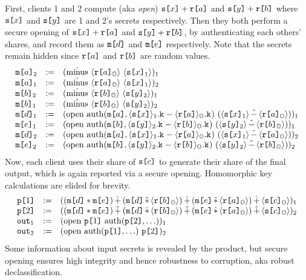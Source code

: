 First, clients 1 and 2 compute (aka \emph{open}) $\texttt{s[}x\texttt{]} +
\texttt{r[}a\texttt{]}$ and $\texttt{s[}y\texttt{]} + \texttt{r[}b\texttt{]}$ where $\texttt{s[}x\texttt{]}$ and
$\texttt{s[}y\texttt{]}$ are 1 and 2's secrets respectively.  Then they both
perform a secure opening of $\texttt{s[}x\texttt{]} + \texttt{r[}a\texttt{]}$ and
$\texttt{s[}y\texttt{]} + \texttt{r[}b\texttt{]}$, by authenticating each others' shares,
and record them as $\texttt{m[}d\texttt{]}$ and $\texttt{m[}e\texttt{]}$ respectively. Note
that the secrets remain hidden since $\texttt{r[}a\texttt{]}$ and $\texttt{r[}b\texttt{]}$
are random values.
$$
\begin{array}{lcl}
  \elab{\mesg{a}}{2} &:=&
  \elab{(\macotp\ \macgv{\elab{\flip{a}}{\Oracle}}\ \macgv{\elab{\secret{x}}{1}})}{1}\\
  \elab{\mesg{a}}{1} &:=&
  \elab{(\macotp\ \macgv{\elab{\flip{a}}{\Oracle}}\ \macgv{\elab{\secret{x}}{1}})}{2}\\
  \elab{\mesg{b}}{2} &:=&
  \elab{(\macotp\ \macgv{\elab{\flip{b}}{\Oracle}}\ \macgv{\elab{\secret{y}}{2}})}{1}\\
  \elab{\mesg{b}}{1} &:=&
  \elab{(\macotp\ \macgv{\elab{\flip{b}}{\Oracle}}\ \macgv{\elab{\secret{y}}{2}})}{2}\\
  \elab{\mesg{d}}{1} &:=&
  \elab{(\macopen\ \macauth(\mesg{a}, \mack{\macx{\secret{x}}{1}}{} \fminus \mack{\macx{\flip{a}}{\Oracle}}{}) \ (\macgv{\elab{\secret{x}}{1}}\macminus\macgv{\elab{\flip{a}}{\Oracle}}))}{1}\\
  \elab{\mesg{e}}{1}&:=&
  \elab{(\macopen\ \macauth(\mesg{b}, \mack{\macx{\secret{y}}{2}}{} \fminus \mack{\macx{\flip{b}}{\Oracle}}{}) \ (\macgv{\elab{\secret{y}}{2}}\macminus\macgv{\elab{\flip{b}}{\Oracle}}))}{1}\\
  \elab{\mesg{d}}{2} &:=&
  \elab{(\macopen\ \macauth(\mesg{a}, \mack{\macx{\secret{x}}{1}}{} \fminus \mack{\macx{\flip{a}}{\Oracle}}{}) \ (\macgv{\elab{\secret{x}}{1}}\macminus\macgv{\elab{\flip{a}}{\Oracle}}))}{2}\\
  \elab{\mesg{e}}{2}&:=&
  \elab{(\macopen\ \macauth(\mesg{b}, \mack{\macx{\secret{y}}{2}}{} \fminus \mack{\macx{\flip{b}}{\Oracle}}{}) \ (\macgv{\elab{\secret{y}}{2}}\macminus\macgv{\elab{\flip{b}}{\Oracle}}))}{2}
\end{array}
$$
Now, each client uses their share of $\texttt{s[}c\texttt{]}$ to generate their
share of the final output, which is again reported via a secure opening.
Homomorphic key calculations are elided for brevity.
$$
\begin{array}{lcl}
  \rvl{1} &:=&
  \elab{( (\mesg{d} \ftimes \mesg{e}) \macplus
          (\mesg{d} \mactimes \macgv{\elab{\flip{b}}{\Oracle}}) \macplus
          (\mesg{e} \mactimes \macgv{\elab{\flip{a}}{\Oracle}}) \macplus \macgv{\elab{\secret{c}}{\Oracle}}
    )}{1}\\
  \rvl{2} &:=&
  \elab{( (\mesg{d} \ftimes \mesg{e}) \macplus
          (\mesg{d} \mactimes \macgv{\elab{\flip{b}}{\Oracle}}) \macplus
          (\mesg{e} \mactimes \macgv{\elab{\flip{a}}{\Oracle}}) \macplus \macgv{\elab{\secret{c}}{\Oracle}}
    )}{2}\\
  \out{1} &:=& \elab{(\macopen\ \rvl{1} \ \macauth(\rvl{2},\ldots))}{1} \\
  \out{2} &:=& \elab{(\macopen\ \macauth(\rvl{1},\ldots) \ \rvl{2})}{2} 
\end{array}
$$
Some information about input secrets is revealed by the product, but
secure opening ensures high integrity and hence robustness to
corruption, aka robust declassification.


